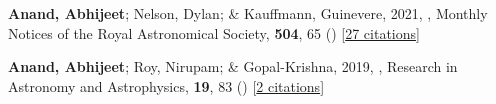 \item[{\color{numcolor}\scriptsize2}] \textbf{Anand, Abhijeet}; Nelson, Dylan; \& Kauffmann, Guinevere, 2021, , Monthly Notices of the Royal Astronomical Society, \textbf{504}, 65 () [\href{https://ui.adsabs.harvard.edu/abs/2021MNRAS.504...65A}{27 citations}]

\item[{\color{numcolor}\scriptsize1}] \textbf{Anand, Abhijeet}; Roy, Nirupam; \& Gopal-Krishna, 2019, , Research in Astronomy and Astrophysics, \textbf{19}, 83 () [\href{https://ui.adsabs.harvard.edu/abs/2019RAA....19...83A}{2 citations}]